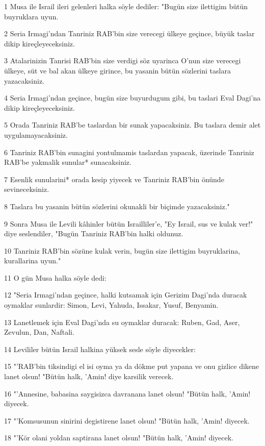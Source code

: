 \par 1 Musa ile Israil ileri gelenleri halka söyle dediler: "Bugün size ilettigim bütün buyruklara uyun.
\par 2 Seria Irmagi'ndan Tanriniz RAB'bin size verecegi ülkeye geçince, büyük taslar dikip kireçleyeceksiniz.
\par 3 Atalarinizin Tanrisi RAB'bin size verdigi söz uyarinca O'nun size verecegi ülkeye, süt ve bal akan ülkeye girince, bu yasanin bütün sözlerini taslara yazacaksiniz.
\par 4 Seria Irmagi'ndan geçince, bugün size buyurdugum gibi, bu taslari Eval Dagi'na dikip kireçleyeceksiniz.
\par 5 Orada Tanriniz RAB'be taslardan bir sunak yapacaksiniz. Bu taslara demir alet uygulamayacaksiniz.
\par 6 Tanriniz RAB'bin sunagini yontulmamis taslardan yapacak, üzerinde Tanriniz RAB'be yakmalik sunular* sunacaksiniz.
\par 7 Esenlik sunularini* orada kesip yiyecek ve Tanriniz RAB'bin önünde sevineceksiniz.
\par 8 Taslara bu yasanin bütün sözlerini okunakli bir biçimde yazacaksiniz."
\par 9 Sonra Musa ile Levili kâhinler bütün Israilliler'e, "Ey Israil, sus ve kulak ver!" diye seslendiler, "Bugün Tanriniz RAB'bin halki oldunuz.
\par 10 Tanriniz RAB'bin sözüne kulak verin, bugün size ilettigim buyruklarina, kurallarina uyun."
\par 11 O gün Musa halka söyle dedi:
\par 12 "Seria Irmagi'ndan geçince, halki kutsamak için Gerizim Dagi'nda duracak oymaklar sunlardir: Simon, Levi, Yahuda, Issakar, Yusuf, Benyamin.
\par 13 Lanetlemek için Eval Dagi'nda su oymaklar duracak: Ruben, Gad, Aser, Zevulun, Dan, Naftali.
\par 14 Levililer bütün Israil halkina yüksek sesle söyle diyecekler:
\par 15 "'RAB'bin tiksindigi el isi oyma ya da dökme put yapana ve onu gizlice dikene lanet olsun! "Bütün halk, 'Amin! diye karsilik verecek.
\par 16 "'Annesine, babasina saygisizca davranana lanet olsun! "Bütün halk, 'Amin! diyecek.
\par 17 "'Komsusunun sinirini degistirene lanet olsun! "Bütün halk, 'Amin! diyecek.
\par 18 "'Kör olani yoldan saptirana lanet olsun! "Bütün halk, 'Amin! diyecek.

